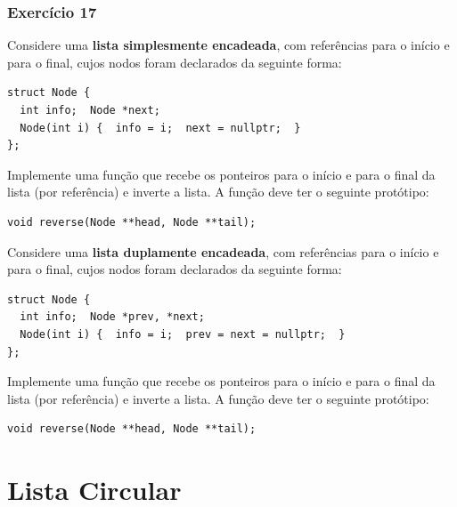 \documentclass[aspectratio=169]{beamer}
\begin{document}
\begin{frame}[fragile]\frametitle{Exercício 17}
\begin{enumerate}
{\scriptsize
        \setcounter{enumi}{16}
	\item Considere uma \textbf{lista simplesmente encadeada}, com referências para o início e para o final, cujos nodos foram declarados da seguinte forma:
\begin{lstlisting}[basicstyle=\ttfamily\tiny]
struct Node {
  int info;  Node *next;
  Node(int i) {  info = i;  next = nullptr;  }
};
\end{lstlisting}
Implemente uma função que recebe os ponteiros para o início e para o final da lista (por referência) e inverte a lista. A função deve ter o seguinte protótipo:
\begin{lstlisting}[basicstyle=\ttfamily\tiny]
void reverse(Node **head, Node **tail);
\end{lstlisting}
	\item Considere uma \textbf{lista duplamente encadeada}, com referências para o início e para o final, cujos nodos foram declarados da seguinte forma:
\begin{lstlisting}[basicstyle=\ttfamily\tiny]
struct Node {
  int info;  Node *prev, *next;
  Node(int i) {  info = i;  prev = next = nullptr;  }
};
\end{lstlisting}
Implemente uma função que recebe os ponteiros para o início e para o final da lista (por referência) e inverte a lista. A função deve ter o seguinte protótipo:
\begin{lstlisting}[basicstyle=\ttfamily\tiny]
void reverse(Node **head, Node **tail);
\end{lstlisting}
}
\end{enumerate}
\end{frame}

\section{Lista Circular}
\end{document}
